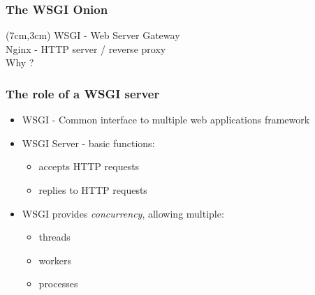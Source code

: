 \documentclass{beamer}
\begin{document}
\begin{frame}
\frametitle<presentation>{The WSGI Onion}


\begin{textblock*}{5cm}(7cm,3cm)
WSGI - Web Server Gateway \\
\vspace{0.4cm}
Nginx - HTTP server / reverse proxy \\
\vspace{0.4cm}
\huge{Why ?}
\end{textblock*}
\end{frame}

\begin{frame}
\frametitle<presentation>{The role of a WSGI server}

\begin{itemize}
  \item WSGI - Common interface to multiple web applications framework
  \item WSGI Server - basic functions:
  \begin{itemize}
    \item accepts HTTP requests
    \item replies to HTTP requests
  \end{itemize}
  \item WSGI provides \textit{concurrency}, allowing multiple: 
  \begin{itemize}
    \item threads
    \item workers
    \item processes
  \end{itemize} 
\end{itemize}

\end{frame}
\end{document}
